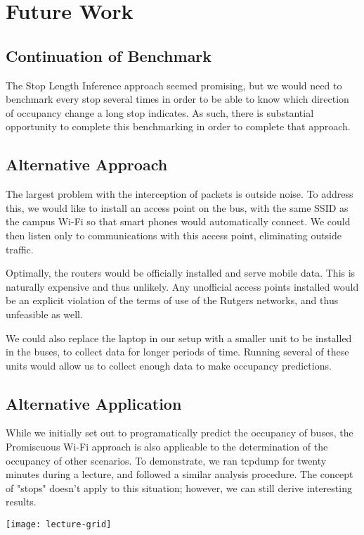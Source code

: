 \section{Future Work}
    
\subsection*{Continuation of Benchmark}
The Stop Length Inference approach seemed promising, but we would need to benchmark every stop several times in order to be able to know which direction of occupancy change a long stop indicates.
As such, there is substantial opportunity to complete this benchmarking in order to complete that approach.

\subsection*{Alternative Approach}
The largest problem with the interception of packets is outside noise.
To address this, we would like to install an access point on the bus, with the same SSID as the campus Wi-Fi so that smart phones would automatically connect.
We could then listen only to communications with this access point, eliminating outside traffic.
	
Optimally, the routers would be officially installed and serve mobile data.
This is naturally expensive and thus unlikely.
Any unofficial access points installed would be an explicit violation of the terms of use of the Rutgers networks, and thus unfeasible as well.

We could also replace the laptop in our setup with a smaller unit to be installed in the buses, to collect data for longer periods of time.
Running several of these units would allow us to collect enough data to make occupancy predictions.

\subsection*{Alternative Application}
While we initially set out to programatically predict the occupancy of buses, the Promiscuous Wi-Fi approach is also applicable to the determination of the occupancy of other scenarios.
To demonstrate, we ran tcpdump for twenty minutes during a lecture, and followed a similar analysis procedure.
The concept of "stops" doesn't apply to this situation; however, we can still derive interesting results.

\begin{figure*}[!t]
  \texttt{[image: lecture-grid]}
  \label{fig:probgrid}
\end{figure*}

